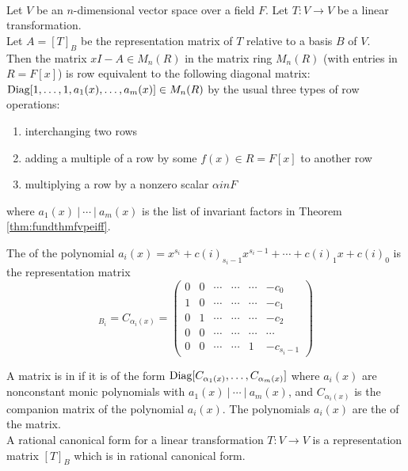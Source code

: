 \begin{theorem}
\label{thm:ifvro}
\\
Let $V$ be an $n$-dimensional vector space over a field $F$. Let $T: V \rightarrow V$ be a linear transformation.\\
Let $A=[T]_B$ be the representation matrix of $T$ relative to a basis $B$ of $V$.\\
Then the matrix $xI - A \in M_n(R)$ in the matrix ring $M_n(R)$ (with entries in $R = F[x]$) is row equivalent to the following diagonal matrix: $\textnormal{Diag}[1, \ldots, 1, a_1(x), \ldots, a_m(x)] \in M_n(R)$ by the usual three types of row operations:
\begin{enumerate}[label=(\roman*)]
\item interchanging two rows
\item adding a multiple of a row by some $f(x) \in R = F[x]$ to another row
\item multiplying a row by a nonzero scalar $\alpha in F$
\end{enumerate}
where $a_1(x) \ | \ \cdots \ | \ a_m(x)$ is the list of invariant factors in Theorem \ref{thm:fundthmfvpeiff}.
\end{theorem}

\begin{definition}
The  of the polynomial $a_i(x) = x^{s_i} + c(i)_{{s_i}-1}x^{{s_i}-1} + \cdots + c(i)_1 x + c(i)_0$ is the representation matrix
\begin{equation}
[T|_{V_{\alpha_i}}]_{B_i} = C_{\alpha_i (x)} =
\begin{pmatrix}
0 & 0 & \cdots & \cdots & \cdots & -c_0 \\
1 & 0 & \cdots & \cdots & \cdots & -c_1 \\
0 & 1 & \cdots & \cdots & \cdots & -c_2 \\
0 & 0 & \cdots & \cdots & \cdots & \cdots \\
0 & 0 & \cdots & \cdots & 1 & -c_{s_i -1}
\end{pmatrix} \nonumber
\end{equation}
\end{definition}

\begin{definition}
A matrix is in  if it is of the form $\textnormal{Diag}[C_{\alpha_1 (x)}, \ldots, C_{\alpha_m(x)}]$ where $a_i(x)$ are nonconstant monic polynomials with $a_1(x) \ | \ \cdots \ | \ a_m(x)$, and $C_{\alpha_i (x)}$ is the companion matrix of the polynomial $a_i(x)$. The polynomials $a_i(x)$ are the  of the matrix.\\
A rational canonical form for a linear transformation $T: V \rightarrow V$ is a representation matrix $[T]_B$ which is in rational canonical form.
\end{definition}

